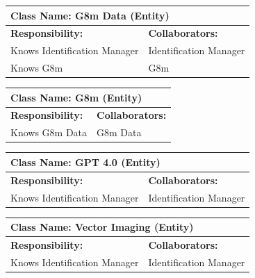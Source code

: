 \documentclass[]{article}
\begin{document}
\begin{table}[ht]
    \centering
    \begin{tabular}{|p{7cm}|p{7cm}|}
        \hline
        \multicolumn{2}{|l|}{\textbf{Class Name: G8m Data (Entity)}} \\
        \hline
        \textbf{Responsibility:} & \textbf{Collaborators:} \\
        \hline
        Knows Identification Manager & Identification Manager \\
        Knows G8m & G8m \\
        \hline
    \end{tabular}
\end{table}
 
\begin{table}[ht]
    \centering
    \begin{tabular}{|p{7cm}|p{7cm}|}
        \hline
        \multicolumn{2}{|l|}{\textbf{Class Name: G8m (Entity)}} \\
        \hline
        \textbf{Responsibility:} & \textbf{Collaborators:} \\
        \hline
        Knows G8m Data & G8m Data \\
        \hline
    \end{tabular}
\end{table}
 
\begin{table}[ht]
    \centering
    \begin{tabular}{|p{7cm}|p{7cm}|}
        \hline
        \multicolumn{2}{|l|}{\textbf{Class Name: GPT 4.0 (Entity)}} \\
        \hline
        \textbf{Responsibility:} & \textbf{Collaborators:} \\
        \hline
        Knows Identification Manager & Identification Manager \\
        \hline
    \end{tabular}
\end{table}
 
\begin{table}[ht]
    \centering
    \begin{tabular}{|p{7cm}|p{7cm}|}
        \hline
        \multicolumn{2}{|l|}{\textbf{Class Name: Vector Imaging (Entity)}} \\
        \hline
        \textbf{Responsibility:} & \textbf{Collaborators:} \\
        \hline
        Knows Identification Manager & Identification Manager \\
        \hline
    \end{tabular}
\end{table}
 
\end{document}
